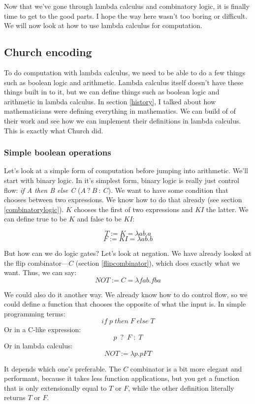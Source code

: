 \documentclass[11pt]{article}
\begin{document}
Now that we've gone through lambda calculus and combinatory logic, it is
finally time to get to the good parts. I hope the way here wasn't too boring or
difficult. We will now look at how to use lambda calculus for computation.

\subsection{Church encoding}

To do computation with lambda calculus, we need to be able to do a few things
such as boolean logic and arithmetic. Lambda calculus itself doesn't have these
things built in to it, but we can define things such as boolean logic and
arithmetic in lambda calculus. In section \ref{history}, I talked about how
mathematicians were defining everything in mathematics. We can build of of
their work and see how we can implement their definitions in lambda calculus.
This is exactly what Church did.


\subsubsection{Simple boolean operations}

Let's look at a simple form of computation before jumping into arithmetic.
We'll start with binary logic. In it's simplest form, binary logic is really
just control flow: \emph{if A then B else C} (\(A\:?\:B\::\:C\)). We want to
have some condition that chooses between two expressions. We know how to do
that already (see section \ref{combinatorylogic}). \(K\) chooses the first of
two expressions and \(KI\) the latter. We can define true to be \(K\) and false
to be \(KI\):

\[T:=K=\lambda ab.a\]
\[F:=KI=\lambda ab.b\]

But how can we do logic gates? Let's look at negation. We have already looked
at the flip combinator---\(C\) (section \ref{flipcombinator}), which does
exactly what we want. Thus, we can say:
\[NOT:=C=\lambda fab.fba\]

We could also do it another way. We already know how to do control flow, so we
could define a function that chooses the opposite of what the input is. In
simple programming terms:
\[if\;p\;then\;F\;else\;T\]
Or in a C-like expression:
\[p\enspace ?\enspace F\;:\;T\]
Or in lambda calculus:
\[NOT:=\lambda p.pFT\]

It depends which one's preferable. The \(C\) combinator is a bit more elegant
and performant, because it takes less function applications, but you get a
function that is only extensionally equal to \(T\) or \(F\), while the other
definition literally returns \(T\) or \(F\).
\end{document}
